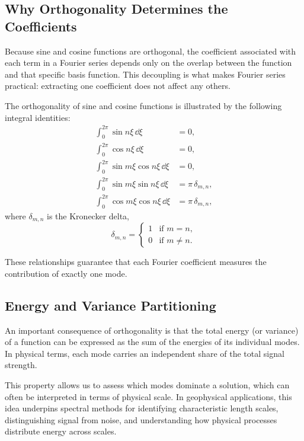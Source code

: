 \subsection{Why Orthogonality Determines the Coefficients}

Because sine and cosine functions are orthogonal, the coefficient associated with each term in a Fourier series depends only on the overlap between the function and that specific basis function. This decoupling is what makes Fourier series practical: extracting one coefficient does not affect any others.

The orthogonality of sine and cosine functions is illustrated by the following integral identities:
\begin{align*}
    \int_0^{2\pi} \sin n\xi \,\dd{\xi} &= 0, \\
    \int_0^{2\pi} \cos n\xi \,\dd{\xi} &= 0, \\
    \int_0^{2\pi} \sin m\xi \cos n\xi \,\dd{\xi} &= 0, \\
    \int_0^{2\pi} \sin m\xi \sin n\xi \,\dd{\xi} &= \pi\, \delta_{m,n}, \\
    \int_0^{2\pi} \cos m\xi \cos n\xi \,\dd{\xi} &= \pi\, \delta_{m,n},
\end{align*}
where $\delta_{m,n}$ is the Kronecker delta,
\[
    \delta_{m,n} =
    \begin{cases}
        1 & \text{if } m = n, \\
        0 & \text{if } m \neq n.
    \end{cases}
\]

These relationships guarantee that each Fourier coefficient measures the contribution of exactly one mode.

\subsection{Energy and Variance Partitioning}

An important consequence of orthogonality is that the total energy (or variance) of a function can be expressed as the sum of the energies of its individual modes. In physical terms, each mode carries an independent share of the total signal strength.

This property allows us to assess which modes dominate a solution, which can often be interpreted in terms of physical scale. In geophysical applications, this idea underpins spectral methods for identifying characteristic length scales, distinguishing signal from noise, and understanding how physical processes distribute energy across scales.

